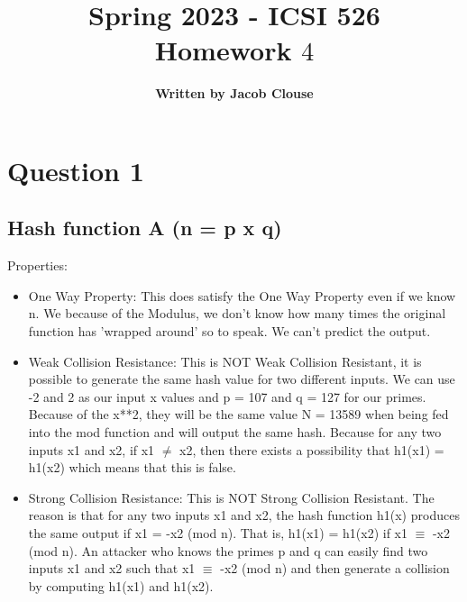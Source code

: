 \documentclass[10pt]{article}
\author{\vspace{0.2in}\textbf{Written by Jacob Clouse}}
\title{Spring 2023 - ICSI 526\\Homework $4$}
\begin{document}
\maketitle
\tableofcontents
\vspace{0.2in}

\section{Question 1}
\subsection{Hash function A (n = p x q)}
\noindent Properties: 
\begin{itemize}
	\item One Way Property: This does satisfy the One Way Property even if we know n. We because of the Modulus, we don't know how many times the original function has 'wrapped around' so to speak. We can't predict the output.
	
	
	\item Weak Collision Resistance: This is NOT Weak Collision Resistant, it is possible to generate the same hash value for two different inputs. We can use -2 and 2 as our input x values and p = 107 and q = 127 for our primes.
	Because of the x**2, they will be the same value N = 13589 when being fed into the mod function and will output the same hash. 
	Because for any two inputs x1 and x2, if x1 $\neq$ x2, then there exists a possibility that h1(x1) = h1(x2) which means that this is false.
	
	
	\item Strong Collision Resistance: This is NOT Strong Collision Resistant. The reason is that for any two inputs x1 and x2, the hash function h1(x) produces the same output if x1 = -x2 (mod n). That is, h1(x1) = h1(x2) if x1 $\equiv$ -x2 (mod n). 
	An attacker who knows the primes p and q can easily find two inputs x1 and x2 such that x1 $\equiv$ -x2 (mod n) and then generate a collision by computing h1(x1) and h1(x2). 
	
\end{itemize}

\vspace{0.2in}
\end{document}
